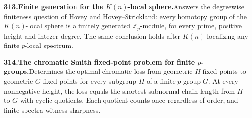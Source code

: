\documentclass[11pt,a4paper]{article}
\begin{document}
  \par \begin{minipage}{\linewidth}
  \fontsize{10.5}{12.6}\selectfont\RaggedRight
  \hypertarget{result 313}{}
  {\bfseries\textcolor{muted}{313.}\enspace Finite generation for the $K(n)$-local sphere.}\enspace Answers the degreewise finiteness question of Hovey and Hovey--Strickland: every homotopy group of the $K(n)$-local sphere is a finitely generated $\mathbb Z_p$-module, for every prime, positive height and integer degree. The same conclusion holds after $K(n)$-localizing any finite $p$-local spectrum.\par
  \end{minipage}\par\vspace{5pt}



  \par \begin{minipage}{\linewidth}
  \fontsize{10.5}{12.6}\selectfont\RaggedRight
  \hypertarget{result 314}{}
  {\bfseries\textcolor{muted}{314.}\enspace The chromatic Smith fixed-point problem for finite $p$-groups.}\enspace Determines the optimal chromatic loss from geometric $H$-fixed points to geometric $G$-fixed points for every subgroup $H$ of a finite $p$-group $G$. At every nonnegative height, the loss equals the shortest subnormal-chain length from $H$ to $G$ with cyclic quotients. Each quotient counts once regardless of order, and finite spectra witness sharpness.\par
  \end{minipage}\par\vspace{5pt}
\end{document}
